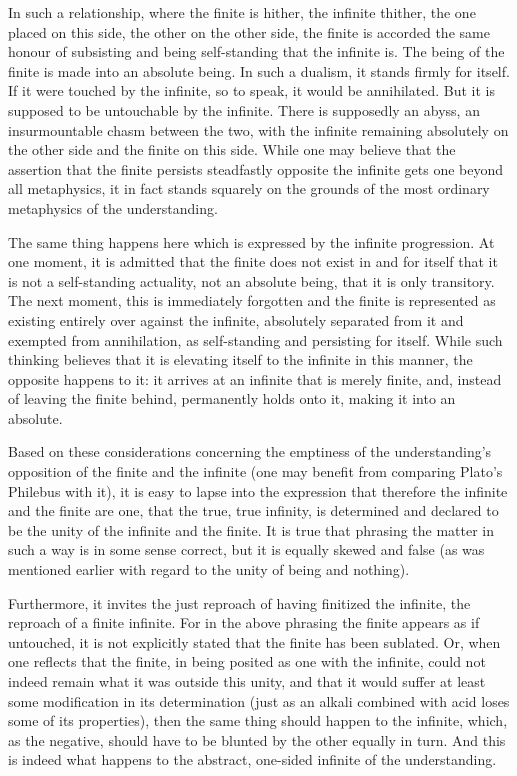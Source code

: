     In such a relationship, where the finite is hither, the infinite thither,
    the one placed on this side, the other on the other side,
    the finite is accorded the same honour of subsisting and
    being self-standing that the infinite is.
    The being of the finite is made into an absolute being.
    In such a dualism, it stands firmly for itself.
    If it were touched by the infinite, so to speak, it would be annihilated.
    But it is supposed to be untouchable by the infinite.
    There is supposedly an abyss, an insurmountable chasm between the two,
    with the infinite remaining absolutely on the other side and
    the finite on this side.
    While one may believe that the assertion that the finite persists steadfastly
    opposite the infinite gets one beyond all metaphysics,
    it in fact stands squarely on the grounds of
    the most ordinary metaphysics of the understanding.

    The same thing happens here which is expressed by the infinite progression.
    At one moment, it is admitted that the finite does not exist in and for itself
    that it is not a self-standing actuality,
    not an absolute being, that it is only transitory.
    The next moment, this is immediately forgotten and the finite is represented
    as existing entirely over against the infinite, absolutely separated from it
    and exempted from annihilation, as self-standing and persisting for itself.
    While such thinking believes that it is elevating itself to
    the infinite in this manner, the opposite happens to it:
    it arrives at an infinite that is merely finite, and,
    instead of leaving the finite behind, permanently holds onto it,
    making it into an absolute.

    Based on these considerations concerning the emptiness of
    the understanding's opposition of the finite and the infinite
    (one may benefit from comparing Plato's Philebus with it),
    it is easy to lapse into the expression that therefore
    the infinite and the finite are one, that the true,
    true infinity, is determined and declared to be
    the unity of the infinite and the finite.
    It is true that phrasing the matter in such a way is
    in some sense correct, but it is equally skewed and false
    (as was mentioned earlier with regard to the unity of being and nothing).

    Furthermore, it invites the just reproach of having
    finitized the infinite, the reproach of a finite infinite.
    For in the above phrasing the finite appears as if untouched,
    it is not explicitly stated that the finite has been sublated.
    Or, when one reflects that the finite, in being posited as one with the
    infinite, could not indeed remain what it was outside this unity, and
    that it would suffer at least some modification in its determination
    (just as an alkali combined with acid loses some of its properties),
    then the same thing should happen to the infinite, which, as the
    negative, should have to be blunted by the other equally in turn.
    And this is indeed what happens to the abstract, one-sided infinite
    of the understanding.

